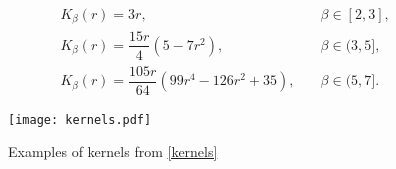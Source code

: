 \documentclass[runningheads]{llncs}
\begin{document}
\begin{eqnarray*}
    &K_{\beta}(r) = 3r, \quad &\beta \in [2, 3],\\
    &K_{\beta}(r) = \dfrac{15r}{4} (5-7r^2), \quad &\beta \in (3, 5],\\
    &K_{\beta}(r) = \dfrac{105r}{64} (99r^4 - 126r^2 + 35), \quad &\beta \in (5, 7].
\end{eqnarray*}

\begin{figure}[h]
\centering
\texttt{[image: kernels.pdf]}
\caption{Examples of kernels from \eqref{kernels}}
\label{fig:kernels}
\end{figure}
\end{document}
